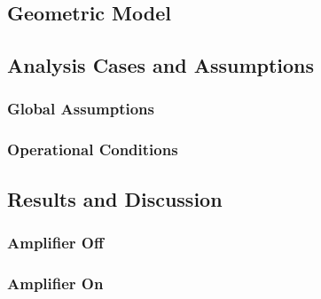  {\small\textit{\lipsum[1-2]}}

\subsection{Geometric Model}
\label{sec:GeometricModel}

 {\small\textit{\lipsum[1-2]}}

\subsection{Analysis Cases and Assumptions}
\label{sec:Analysis}

 {\small\textit{\lipsum[1-2]}}

\subsubsection{Global Assumptions}
\label{subsec:Assumptions}

 {\small\textit{\lipsum[1-2]}}

\subsubsection{Operational Conditions}
\label{subsec:OpConditions}

 {\small\textit{\lipsum[1-2]}}

\subsection{Results and Discussion}
\label{sec:Results}

 {\small\textit{\lipsum[1-2]}}

\subsubsection{Amplifier Off}
\label{sec:AmpOff}

 {\small\textit{\lipsum[1-2]}}

\subsubsection{Amplifier On}
\label{sec:AmpOn}

